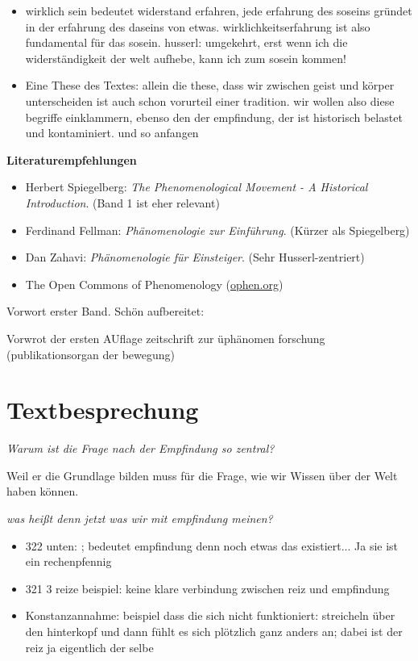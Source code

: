 \documentclass[a4paper, emulatestandardclasses]{scrartcl}
\begin{document}
\begin{itemize}
  \item wirklich sein bedeutet widerstand erfahren, jede erfahrung des soseins gründet in der erfahrung des daseins von etwas. wirklichkeitserfahrung ist also fundamental für das sosein. husserl: umgekehrt, erst wenn ich die widerständigkeit der welt aufhebe, kann ich zum sosein kommen!
  \item Eine These des Textes: allein die these, dass wir zwischen geist und körper unterscheiden ist auch schon vorurteil einer tradition. wir wollen also diese begriffe einklammern, ebenso den der empfindung, der ist historisch belastet und kontaminiert. und so anfangen
\end{itemize}

\textbf{Literaturempfehlungen}

\begin{itemize}
  \item Herbert Spiegelberg: \emph{The Phenomenological Movement - A Historical Introduction}. (Band 1 ist eher relevant)
  \item Ferdinand Fellman: \emph{Phänomenologie zur Einführung}. (Kürzer als Spiegelberg)
  \item Dan Zahavi: \emph{Phänomenologie für Einsteiger}. (Sehr Husserl-zentriert)
  \item The Open Commons of Phenomenology (\url{ophen.org})
\end{itemize}


Vorwort erster Band. Schön aufbereitet:

  Vorwrot der ersten AUflage zeitschrift zur üphänomen forschung (publikationsorgan der bewegung)

\section*{Textbesprechung}

\emph{Warum ist die Frage nach der Empfindung so zentral?}

Weil er die Grundlage bilden muss für die Frage, wie wir Wissen über der Welt haben können.\newline

\noindent \emph{was heißt denn jetzt was wir mit empfindung meinen?}



\begin{itemize}
  \item 322 unten: ; bedeutet empfindung denn noch etwas das existiert... Ja sie ist ein rechenpfennig
  \item 321 3 reize beispiel: keine klare verbindung zwischen reiz und empfindung
  \item Konstanzannahme: beispiel dass die sich nicht funktioniert: streicheln über den hinterkopf und dann fühlt es sich plötzlich ganz anders an; dabei ist der reiz ja eigentlich der selbe
\end{itemize}
\end{document}
